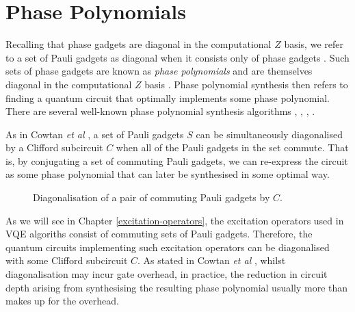 \section{Phase Polynomials}%
\label{phase-polynomials}

Recalling that phase gadgets are diagonal in the computational $Z$ basis, we refer to a set of Pauli gadgets as diagonal when it consists only of phase gadgets \cite{Cowtan2020}. Such sets of phase gadgets are known as \textit{phase polynomials} and are themselves diagonal in the computational $Z$ basis \cite{Cowtan2019}. Phase polynomial synthesis then refers to finding a quantum circuit that optimally implements some phase polynomial. There are several well-known phase polynomial synthesis algorithms \cite{Amy2013}, \cite{Amy2014}, \cite{Nam2018}, \cite{Maslov2018}.

As in Cowtan \textit{et al} \cite{Cowtan2020}, a set of Pauli gadgets $S$ can be simultaneously diagonalised by a Clifford subcircuit $C$ when all of the Pauli gadgets in the set commute. That is, by conjugating a set of commuting Pauli gadgets, we can re-express the circuit as some phase polynomial that can later be synthesised in some optimal way.

\begin{figure}[H]
    \centering
    \caption{Diagonalisation of a pair of commuting Pauli gadgets by $C$.}
\end{figure}

As we will see in Chapter \ref{excitation-operators}, the excitation operators used in VQE algoriths consist of commuting sets of Pauli gadgets. Therefore, the quantum circuits implementing such excitation operators can be diagonalised with some Clifford subcircuit $C$. As stated in Cowtan \textit{et al} \cite{Cowtan2020}, whilst diagonalisation may incur gate overhead, in practice, the reduction in circuit depth arising from synthesising the resulting phase polynomial usually more than makes up for the overhead.
